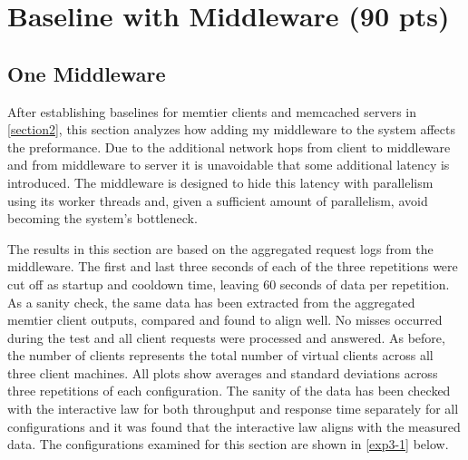 \documentclass[11pt,a4paper]{article}
\begin{document}

\section{Baseline with Middleware (90 pts)}

\subsection{One Middleware} \label{sec3.1}
After establishing baselines for memtier clients and memcached servers in \autoref{section2}, this section analyzes how adding my middleware to the system affects the preformance. Due to the additional network hops from client to middleware and from middleware to server it is unavoidable that some additional latency is introduced. The middleware is designed to hide this latency with parallelism using its worker threads and, given a sufficient amount of parallelism, avoid becoming the system's bottleneck.

The results in this section are based on the aggregated request logs from the middleware. The first and last three seconds of each of the three repetitions were cut off as startup and cooldown time, leaving 60 seconds of data per repetition. As a sanity check, the same data has been extracted from the aggregated memtier client outputs, compared and found to align well. No misses occurred during the test and all client requests were processed and answered. As before, the number of clients represents the total number of virtual clients across all three client machines. All plots show averages and standard deviations across three repetitions of each configuration. The sanity of the data has been checked with the interactive law for both throughput and response time separately for all configurations and it was found that the interactive law aligns with the measured data. The configurations examined for this section are shown in \autoref{exp3-1} below.
\end{document}
